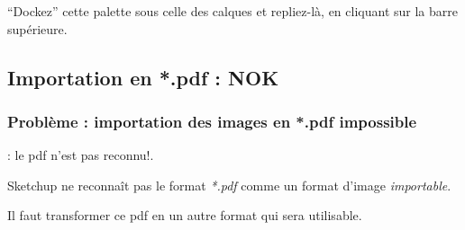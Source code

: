 \documentclass[a4paper,12pt,french]{sphinxmanual}
\begin{document}
``Dockez'' cette palette sous celle des calques et repliez-là, en cliquant sur la barre supérieure.


\subsection{Importation en *.pdf : NOK}
\label{su/import-ssqu:importation-en-pdf-nok}

\subsubsection{Problème : importation des images en *.pdf impossible}
\label{su/import-ssqu:probleme-importation-des-images-en-pdf-impossible}
 :  le pdf n'est pas reconnu!.

Sketchup ne reconnaît pas le format \emph{*.pdf} comme un format d'image \emph{importable}.

Il faut transformer ce pdf en un autre format qui sera utilisable.
\end{document}
